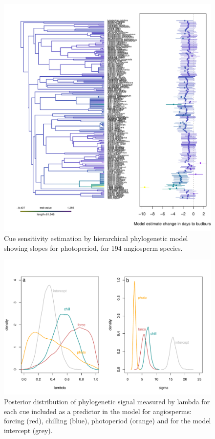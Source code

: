 \documentclass{article}\usepackage[]{graphicx}\usepackage[]{color}
\begin{document}
\begin{figure} [H]
  \begin{center}
  \includegraphics[width=14cm]{..//..//analyses/phylogeny/figures/muplot_phylo_photo.pdf}
  \caption{Cue sensitivity estimation by hierarchical phylogenetic model showing slopes for photoperiod, for 194 angiosperm species.}
  \label{fig:muplot_photo}
  \end{center}
\end{figure}


\begin{figure} [H]
  \begin{center}
  \includegraphics[width=14cm]{..//..//analyses/phylogeny/figures/lambdas_sigmas_density_noout.pdf}
  \caption{Posterior distribution of phylogenetic signal measured by lambda for each cue included as a predictor in the model for angiosperms: forcing (red), chilling (blue),  photoperiod (orange) and for the model intercept (grey).}
  \label{fig:phylosig_angio}
  \end{center}
\end{figure}
\end{document}
